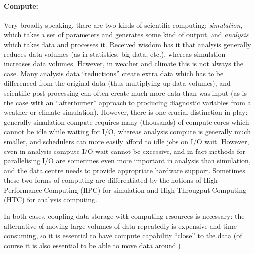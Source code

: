 \paragraph{Compute:}
Very broadly speaking, there are two kinds of scientific computing:
\textit{simulation}, which takes a set of parameters and generates some kind of
output, and \textit{analysis} which takes data and processes it. Received wisdom
has it that analysis generally reduces data volumes (as in statistics, big data,
etc.), whereas simulation increases data volumes. However, in weather and
climate this is not always the case. Many analysis data ``reductions'' create
extra data which has to be differenced from the original data (thus multiplying
up data volumes), and scientific post-processing can often create much more data
than was input (as is the case with an ``afterburner'' approach to producing
diagnostic variables from a weather or climate simulation).  However, there is
one crucial distinction in play: generally simulation compute requires many
(thousands) of compute cores which cannot be idle while waiting for I/O, whereas
analysis compute is generally much smaller, and schedulers can more easily
afford to idle jobs on I/O wait. However, even in analysis compute I/O wait
cannot be excessive, and in fact methods for parallelising I/O are sometimes
even more important in analysis than simulation, and the data centre needs to
provide appropriate hardware support.  Sometimes these two forms of computing
are differentiated by the notions of High Performance Computing (HPC) for
simulation and High Througput Computing (HTC) for analysis computing.

In both cases, coupling data storage with computing resources is necessary: the
alternative of moving large volumes of data repeatedly is expensive and time
consuming, so it is essential to have compute %
capability ``close'' to the data (of course it is also essential to be able to
move data around.)

